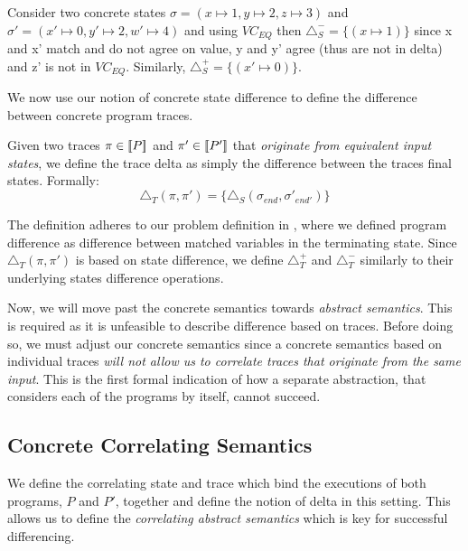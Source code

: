 \begin{Example}
Consider two concrete states $\sigma = (x \mapsto 1,y \mapsto 2,z \mapsto 3)$ and $\sigma' = (x' \mapsto 0,y' \mapsto 2,w' \mapsto 4)$ and using $VC_{EQ}$ then $\triangle_{S}^{-} = \{ (x \mapsto 1) \}$ since x and x' match and do not agree on value, y and y' agree (thus are not in delta) and z' is not in $VC_{EQ}$. Similarly, $\triangle_{S}^{+} = \{ (x' \mapsto 0) \}$.
\end{Example}

We now use our notion of concrete state difference to define the difference between concrete program traces.

\begin{definition}
Given two traces $\pi \in \lbrack\!\lbrack P \rbrack\!\rbrack$ and $\pi' \in \lbrack\!\lbrack P' \rbrack\!\rbrack$ that \emph{originate from equivalent input states}, we define the trace delta as simply the difference between the traces final states. Formally:
\[
\triangle_{T}(\pi,\pi') = \{ \triangle_{S}(\sigma_{end},\sigma'_{end'}) \}
\]
\end{definition}

The definition adheres to our problem definition in , where we defined program difference as difference between matched variables in the terminating state. Since $\triangle_{T}(\pi,\pi')$ is based on state difference, we define $\triangle_{T}^{+}$ and $\triangle_{T}^{-}$ similarly to their underlying states difference operations.

Now, we will move past the concrete semantics towards \emph{abstract semantics}. This is required as it is unfeasible to describe difference based on traces. Before doing so, we must adjust our concrete semantics since a concrete semantics based on individual traces \emph{will not allow us to correlate traces that originate from the same input}. This is the first formal indication of how a separate abstraction, that considers each of the programs by itself, cannot succeed.

\subsection{Concrete Correlating Semantics} 

We define the correlating state and trace which bind the executions of both programs, $P$ and $P'$, together and define the notion of delta in this setting. This allows us to define the \emph{correlating abstract semantics} which is key for successful differencing.

